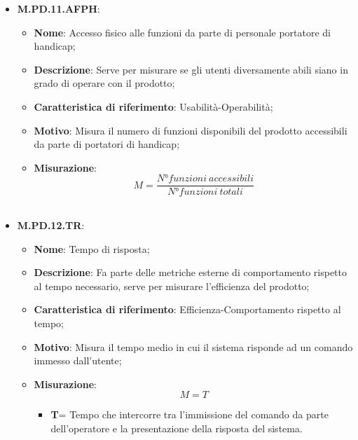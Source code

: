 \documentclass[10pt, a4paper]{article}
\begin{document}
\begin{itemize}
    

     \item \textbf{M.PD.11.AFPH}:
    \begin{itemize}
        \item \textbf{Nome}: Accesso fisico alle funzioni da parte di personale portatore di handicap;
        \item \textbf{Descrizione}: Serve per misurare se gli utenti diversamente abili siano in grado di operare con il prodotto;
        \item \textbf{Caratteristica di riferimento}: Usabilità-Operabilità;
        \item \textbf{Motivo}: Misura il numero di funzioni disponibili del prodotto accessibili da parte di portatori di handicap; 
       \item \textbf{Misurazione}:   \[ M=\frac{N°funzioni \ accessibili}{N°funzioni \ totali} \] \\
      
      
    \end{itemize}


 \item \textbf{M.PD.12.TR}:
    \begin{itemize}
        \item \textbf{Nome}: Tempo di risposta;
        \item \textbf{Descrizione}: Fa parte delle metriche esterne di comportamento rispetto al tempo necessario, serve per misurare l'efficienza del prodotto;
        \item \textbf{Caratteristica di riferimento}: Efficienza-Comportamento rispetto al tempo;
        \item \textbf{Motivo}: Misura il tempo medio in cui il sistema risponde ad un comando immesso dall'utente; 
       \item \textbf{Misurazione}:   \[ M=T \] 
       \begin{itemize}
           \item \textbf{T}= Tempo che intercorre tra l'immissione del comando da parte dell'operatore e la presentazione della risposta del sistema.\\ 
       \end{itemize}
    \end{itemize}


\end{itemize}
\end{document}
